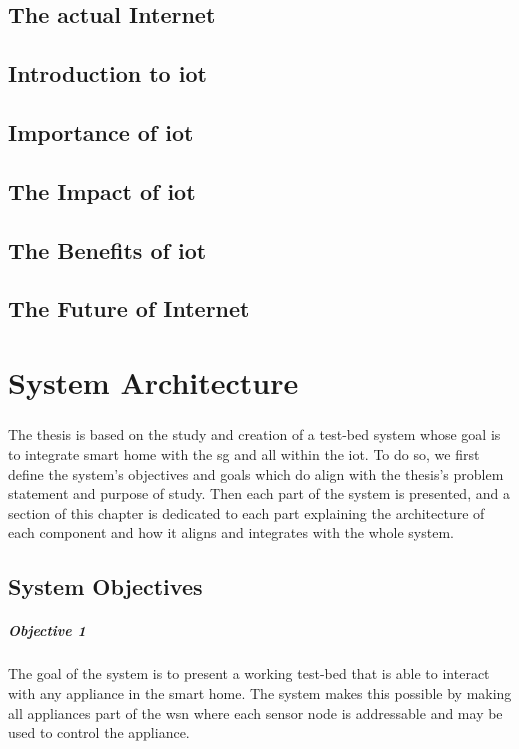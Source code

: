 \documentclass[oneside,12pt,a4paper,final]{book}
\begin{document}
\section{The actual Internet}
\section{Introduction to \gls{iot}}
\section{Importance of \gls{iot}}
\section{The Impact of \gls{iot}}
\section{The Benefits of \gls{iot}}
\section{The Future of Internet}


\chapter{System Architecture}
\paragraph{}
The thesis is based on the study and creation of a test-bed system whose goal is to integrate smart home with the \gls{sg} and all within the \gls{iot}. To do so, we first define the system's objectives and goals which do align  with the thesis's problem statement and purpose of study. Then each part of the system is presented, and a section of this chapter is dedicated to each part explaining the architecture of each component and how it aligns and integrates with the whole system.
\section{System Objectives}
\paragraph{Objective 1}
The goal of the system is to present a working test-bed that is able to interact with any appliance in the smart home. The system makes this possible by making all appliances part of the \gls{wsn} where each sensor node is addressable and may be used to control the appliance.
\end{document}
